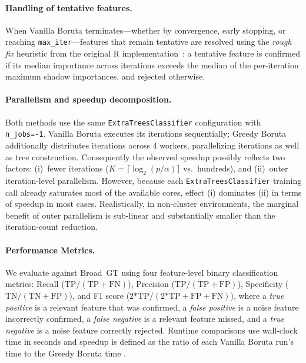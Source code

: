 \documentclass[runningheads]{llncs}
\begin{document}
\paragraph{Handling of tentative features.}
When Vanilla Boruta terminates---whether by convergence, early stopping, or reaching \texttt{max\_iter}---features that remain tentative are resolved using the \emph{rough fix} heuristic from the original R implementation~\cite{kursa2010feature}: a tentative feature is confirmed if its median importance across iterations exceeds the median of the per-iteration maximum shadow importances, and rejected otherwise. 

\paragraph{Parallelism and speedup decomposition.}
Both methods use the same \texttt{ExtraTreesClassifier} configuration with \texttt{n\_jobs=-1}. Vanilla Boruta executes its iterations sequentially; Greedy Boruta additionally distributes iterations across 4 workers, parallelizing iterations as well as tree construction. Consequently the observed speedup possibly reflects two factors: (i)~fewer iterations ($K = \lceil \log_2(p/\alpha) \rceil$ vs.\ hundreds), and (ii)~outer iteration-level parallelism. However, because each \texttt{ExtraTreesClassifier} training call already saturates most of the available cores, effect (i) dominates (ii) in terms of speedup in most cases. Realistically, in non-cluster environments, the marginal benefit of outer parallelism is sub-linear and substantially smaller than the iteration-count reduction.

\paragraph{Performance Metrics.}
We evaluate against Broad~GT using four feature-level binary classification metrics: Recall ($\text{TP}/(\text{TP}+\text{FN})$), Precision ($\text{TP}/(\text{TP}+\text{FP})$), Specificity ($\text{TN}/(\text{TN}+\text{FP})$), and F1 score ($\text{2*TP}/(\text{2*TP}+\text{FP}+\text{FN})$), where a \emph{true positive} is a relevant feature that was confirmed, a \emph{false positive} is a noise feature incorrectly confirmed, a \emph{false negative} is a relevant feature missed, and a \emph{true negative} is a noise feature correctly rejected. Runtime comparisons use wall-clock time in seconds and speedup is defined as the ratio of each Vanilla Boruta run's time to the Greedy Boruta time .
 
\end{document}
